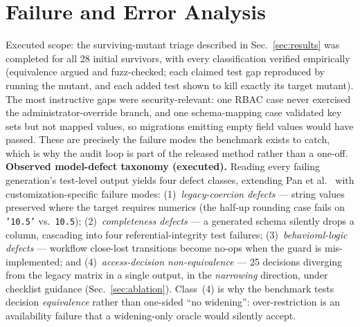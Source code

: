 \documentclass[journal]{IEEEtran}
\begin{document}
\section{Failure and Error Analysis}
\label{sec:failure}
Executed scope: the surviving-mutant triage described in Sec.~\ref{sec:results} was completed
for all 28 initial survivors, with every classification verified empirically (equivalence
argued and fuzz-checked; each claimed test gap reproduced by running the mutant, and each
added test shown to kill exactly its target mutant). The most instructive gaps were
security-relevant: one RBAC case never exercised the administrator-override branch, and one
schema-mapping case validated key sets but not mapped values, so migrations emitting empty
field values would have passed. These are precisely the failure modes the benchmark exists to
catch, which is why the audit loop is part of the released method rather than a one-off.
\textbf{Observed model-defect taxonomy (executed).} Reading every failing generation's
test-level output yields four defect classes, extending Pan et al.~\cite{pan2024lost} with
customization-specific failure modes: (1)~\emph{legacy-coercion defects} --- string values
preserved where the target requires numerics (the half-up rounding case fails on
\texttt{'10.5'} vs.\ \texttt{10.5}); (2)~\emph{completeness defects} --- a generated schema
silently drops a column, cascading into four referential-integrity test failures;
(3)~\emph{behavioral-logic defects} --- workflow close-lost transitions become no-ops when
the guard is mis-implemented; and (4)~\emph{access-decision non-equivalence} --- 25 decisions
diverging from the legacy matrix in a single output, in the \emph{narrowing} direction,
under checklist guidance (Sec.~\ref{sec:ablation}). Class~(4) is why the benchmark tests
decision \emph{equivalence} rather than one-sided ``no widening'': over-restriction is an
availability failure that a widening-only oracle would silently accept.
\end{document}

